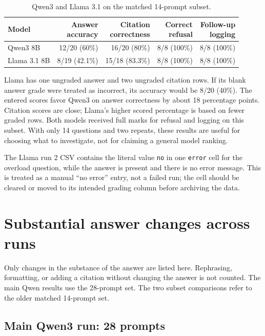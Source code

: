 \documentclass[11pt,a4paper]{article}
\begin{document}
\begin{table}[htbp]
\centering
\caption{Qwen3 and Llama 3.1 on the matched 14-prompt subset.}
\label{tab:model-subset}
\begin{tabular}{lrrrr}
\toprule
Model & \shortstack{Answer\\accuracy} & \shortstack{Citation\\correctness} & \shortstack{Correct\\refusal} & \shortstack{Follow-up\\logging} \\
\midrule
Qwen3 8B & 12/20 (60\%) & 16/20 (80\%) & 8/8 (100\%) & 8/8 (100\%) \\
Llama 3.1 8B & 8/19 (42.1\%) & 15/18 (83.3\%) & 8/8 (100\%) & 8/8 (100\%) \\
\bottomrule
\end{tabular}
\end{table}

Llama has one ungraded answer and two ungraded citation rows. If its blank answer grade were treated as incorrect, its accuracy would be 8/20 (40\%). The entered scores favor Qwen3 on answer correctness by about 18 percentage points. Citation scores are close; Llama's higher scored percentage is based on fewer graded rows. Both models received full marks for refusal and logging on this subset. With only 14 questions and two repeats, these results are useful for choosing what to investigate, not for claiming a general model ranking.

The Llama run 2 CSV contains the literal value \texttt{no} in one \texttt{error} cell for the overload question, while the answer is present and there is no error message. This is treated as a manual ``no error'' entry, not a failed run; the cell should be cleared or moved to its intended grading column before archiving the data.

\section{Substantial answer changes across runs}

Only changes in the substance of the answer are listed here. Rephrasing, formatting, or adding a citation without changing the answer is not counted. The main Qwen results use the 28-prompt set. The two subset comparisons refer to the older matched 14-prompt set.

\subsection{Main Qwen3 run: 28 prompts}
\end{document}
